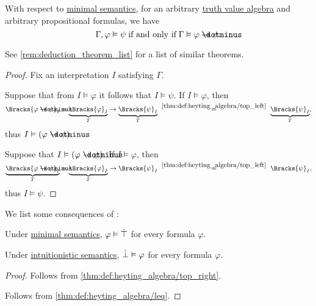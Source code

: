 \begin{theorem}\label{thm:propositional_semantic_deduction_theorem}
  With respect to \hyperref[def:minimal_propositional_semantics]{minimal semantics}, for an arbitrary \hyperref[con:truth_value_algebra]{truth value algebra} and arbitrary propositional formulas, we have
  \begin{equation*}
    \Gamma, \varphi \vDash \psi \T{if and only if} \Gamma \vDash \varphi \synimplies \psi.
  \end{equation*}
\end{theorem}
\begin{comments}
  \item See \cref{rem:deduction_theorem_list} for a list of similar theorems.
\end{comments}
\begin{proof}
  Fix an interpretation \( I \) satisfying \( \Gamma \).

  \SufficiencySubProof Suppose that from \( I \vDash \varphi \) it follows that \( I \vDash \psi \). If \( I \vDash \varphi \), then
  \begin{equation*}
    \Bracks{\varphi \synimplies \psi}_I
    =
    \underbrace{\Bracks{\varphi}_I}_T \rightarrow \underbrace{\Bracks{\psi}_I}_T
    \reloset {\ref{thm:def:heyting_algebra/top_left}} =
    \underbrace{\Bracks{\psi}_I}_T,
  \end{equation*}
  thus \( I \vDash (\varphi \synimplies \psi) \).

  \NecessitySubProof Suppose that \( I \vDash (\varphi \synimplies \psi) \). If \( I \vDash \varphi \), then
  \begin{equation*}
    \underbrace{\Bracks{\varphi \synimplies \psi}_I}_{T}
    =
    \underbrace{\Bracks{\varphi}_I}_T \rightarrow \Bracks{\psi}_I
    \reloset {\ref{thm:def:heyting_algebra/top_left}} =
    \Bracks{\psi}_I,
  \end{equation*}
  thus \( I \vDash \psi \).
\end{proof}

\begin{corollary}\label{thm:intuitionistic_deduction_consequences}
  We list some consequences of :
  \begin{thmenum}
     Under \hyperref[def:minimal_propositional_semantics]{minimal semantics}, \( \varphi \vDash \dot{\top} \) for every formula \( \varphi \).

     Under \hyperref[def:propositional_semantics/intuitionistic]{intuitionistic semantics}, \( \dot{\bot} \vDash \varphi \) for every formula \( \varphi \).
  \end{thmenum}
\end{corollary}
\begin{proof}
   Follows from \cref{thm:def:heyting_algebra/top_right}.

   Follows from \cref{thm:def:heyting_algebra/leq}.
\end{proof}

